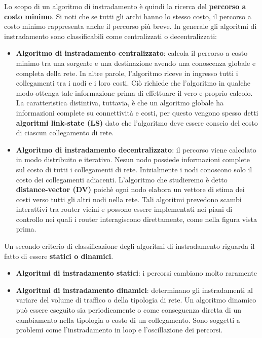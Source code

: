 \documentclass[11pt,a4paper]{article}
\begin{document}
Lo scopo di un algoritmo di instradamento è quindi la ricerca del \textbf{percorso a costo minimo}. Si noti che se tutti gli archi hanno lo stesso costo, il percorso a costo minimo rappresenta anche il percorso più breve. In generale gli algoritmi di instradamento sono classificabili come centralizzati o decentralizzati:
\begin{itemize}
	\item \textbf{Algoritmo di instradamento centralizzato}: calcola il percorso a costo minimo tra una sorgente e una destinazione avendo una conoscenza globale e completa della rete. In altre parole, l'algoritmo riceve in ingresso tutti i collegamenti tra i nodi e i loro costi. Ciò richiede che l'algoritmo in qualche modo ottenga tale informazione prima di effettuare il vero e proprio calcolo. La caratteristica distintiva, tuttavia, è che un algoritmo globale ha informazioni complete su connettività e costi, per questo vengono spesso detti \textbf{algoritmi link-state (LS)} dato che l'algoritmo deve essere conscio del costo di ciascun collegamento di rete.
	\item \textbf{Algoritmo di instradamento decentralizzato}: il percorso viene calcolato in modo distribuito e iterativo. Nesun nodo possiede informazioni complete sul costo di tutti i collegamenti di rete. Inizialmente i nodi conoscono solo il costo dei collegamenti adiacenti. L'algoritmo che studieremo è detto \textbf{distance-vector (DV)} poichè ogni nodo elabora un vettore di stima dei costi verso tutti gli altri nodi nella rete. Tali algoritmi prevedono scambi interattivi tra router vicini e possono essere implementati nei piani di controllo nei quali i router interagiscono direttamente, come nella figura vista prima.
\end{itemize}
Un secondo criterio di classificazione degli algoritmi di instradamento riguarda il fatto di essere \textbf{statici o dinamici}.
\begin{itemize}
	\item \textbf{Algoritmi di instradamento statici}: i percorsi cambiano molto raramente
	\item \textbf{Algoritmi di instradamento dinamici}: determinano gli instradamenti al variare del volume di traffico o della tipologia di rete. Un algoritmo dinamico può essere eseguito sia periodicamente o come conseguenza diretta di un cambiamento nella tipologia o costo di un collegamento. Sono soggetti a problemi come l'instradamento in loop e l'oscillazione dei percorsi.
\end{itemize}
\end{document}
